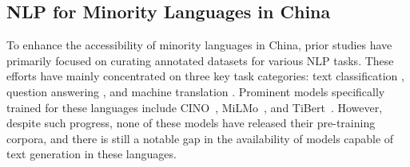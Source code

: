 
\subsection{NLP for Minority Languages in China}
To enhance the accessibility of minority languages in China, prior studies have primarily focused on curating annotated datasets for various NLP tasks. These efforts have mainly concentrated on three key task categories: text classification \cite{bo-classfy,bo-classfy-2,bo-classfy-3}, question answering \cite{boqa}, and machine translation \cite{bomt}. Prominent models specifically trained for these languages include CINO~\citep{cino}, MiLMo~\citep{milmo}, and TiBert~\citep{tibert}. However, despite such progress, none of these models have released their pre-training corpora, and there is still a notable gap in the availability of models capable of text generation in these languages.


    
